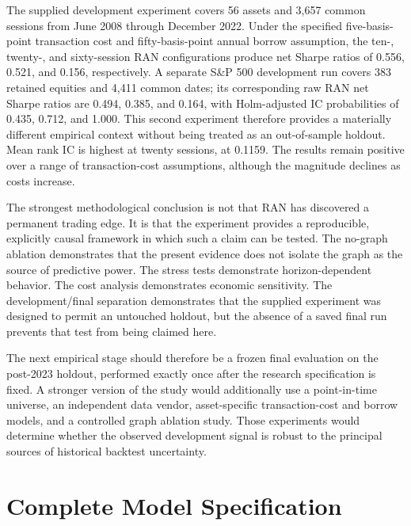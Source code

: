 \documentclass[10pt]{article}
\begin{document}
The supplied development experiment covers 56 assets and 3,657 common sessions from June 2008 through December 2022. Under the specified five-basis-point transaction cost and fifty-basis-point annual borrow assumption, the ten-, twenty-, and sixty-session RAN configurations produce net Sharpe ratios of 0.556, 0.521, and 0.156, respectively. A separate S\&P 500 development run covers 383 retained equities and 4,411 common dates; its corresponding raw RAN net Sharpe ratios are 0.494, 0.385, and 0.164, with Holm-adjusted IC probabilities of 0.435, 0.712, and 1.000. This second experiment therefore provides a materially different empirical context without being treated as an out-of-sample holdout. Mean rank IC is highest at twenty sessions, at 0.1159. The results remain positive over a range of transaction-cost assumptions, although the magnitude declines as costs increase.

The strongest methodological conclusion is not that RAN has discovered a permanent trading edge. It is that the experiment provides a reproducible, explicitly causal framework in which such a claim can be tested. The no-graph ablation demonstrates that the present evidence does not isolate the graph as the source of predictive power. The stress tests demonstrate horizon-dependent behavior. The cost analysis demonstrates economic sensitivity. The development/final separation demonstrates that the supplied experiment was designed to permit an untouched holdout, but the absence of a saved final run prevents that test from being claimed here.

The next empirical stage should therefore be a frozen final evaluation on the post-2023 holdout, performed exactly once after the research specification is fixed. A stronger version of the study would additionally use a point-in-time universe, an independent data vendor, asset-specific transaction-cost and borrow models, and a controlled graph ablation study. Those experiments would determine whether the observed development signal is robust to the principal sources of historical backtest uncertainty.

\appendix

\section{Complete Model Specification}
\end{document}
